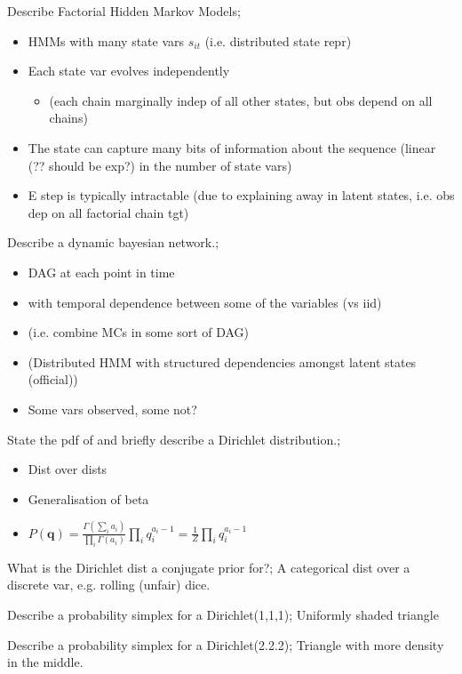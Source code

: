 \documentclass{article}
\begin{document}
Describe Factorial Hidden Markov Models; \begin{itemize}
    \item HMMs with many state vars $s_{it}$ (i.e. distributed state repr)
    \item Each state var evolves independently
    \begin{itemize}
        \item (each chain marginally indep of all other states, but obs depend on all chains)
    \end{itemize}
    \item The state can capture many bits of information about the sequence (linear (?? should be exp?) in the number of state vars)
    \item E step is typically intractable (due to explaining away in latent states, i.e. obs dep on all factorial chain tgt)
\end{itemize}

Describe a dynamic bayesian network.; \begin{itemize}
    \item DAG at each point in time
    \item with temporal dependence between some of the variables (vs iid)
    \item (i.e. combine MCs in some sort of DAG)
    \item (Distributed HMM with structured dependencies amongst latent states (official))
    \item Some vars observed, some not?
\end{itemize}

State the pdf of and briefly describe a Dirichlet distribution.; \begin{itemize}
    \item Dist over dists
    \item Generalisation of beta
    \item $P(\mathbf{q})=\frac{\Gamma(\sum_i a_i)}{\prod_i \Gamma(a_i)}\prod_i q^{a_i-1}_i=\frac{1}{Z}\prod_iq_i^{a_i-1}$
\end{itemize}

What is the Dirichlet dist a conjugate prior for?; A categorical dist over a discrete var, e.g. rolling (unfair) dice.

Describe a probability simplex for a Dirichlet(1,1,1); Uniformly shaded triangle

Describe a probability simplex for a Dirichlet(2.2.2); Triangle with more density in the middle.
\end{document}
